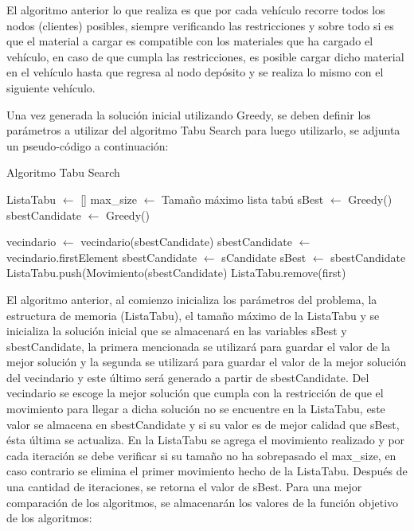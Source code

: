 \documentclass[conference]{IEEEtran}
\begin{document}
El algoritmo anterior lo que realiza es que por cada veh\'iculo recorre todos los nodos (clientes) posibles, siempre verificando las restricciones y sobre todo si es que el material a cargar es compatible con los materiales que ha cargado el veh\'iculo, en caso de que cumpla las restricciones, es posible cargar dicho material en el veh\'iculo hasta que regresa al nodo dep\'osito y se realiza lo mismo con el siguiente veh\'iculo.

Una vez generada la soluci\'on inicial utilizando Greedy, se deben definir los par\'ametros a utilizar del algoritmo Tabu Search para luego utilizarlo, se adjunta un pseudo-c\'odigo a continuaci\'on:

\begin{algorithm}
\caption{Algoritmo Tabu Search}
\begin{algorithmic}[1]

\STATE ListaTabu $\gets$ []
\STATE max\_size $\gets$ Tama\~no m\'aximo lista tab\'u
\STATE sBest $\gets$ Greedy()
\STATE sbestCandidate $\gets$ Greedy()

    \STATE vecindario $\gets$ vecindario(sbestCandidate)
    \STATE sbestCandidate $\gets$ vecindario.firstElement
                \STATE sbestCandidate $\gets$ sCandidate
        \ENDIF
    \ENDFOR
        \STATE sBest $\gets$ sbestCandidate
    \ENDIF
    \STATE ListaTabu.push(Movimiento(sbestCandidate)
        \STATE ListaTabu.remove(first)
    \ENDIF
\ENDWHILE

\end{algorithmic}
\end{algorithm}

El algoritmo anterior, al comienzo inicializa los par\'ametros del problema, la estructura de memoria (ListaTabu), el tama\~no m\'aximo de la ListaTabu y se inicializa la soluci\'on inicial que se almacenar\'a en las variables sBest y sbestCandidate, la primera mencionada se utilizar\'a para guardar el valor de la mejor soluci\'on y la segunda se utilizar\'a para guardar el valor de la mejor soluci\'on del vecindario y este \'ultimo ser\'a generado a partir de sbestCandidate. Del vecindario se escoge la mejor soluci\'on que cumpla con la restricci\'on de que el movimiento para llegar a dicha soluci\'on no se encuentre en la ListaTabu, este valor se almacena en sbestCandidate y si su valor es de mejor calidad que sBest, \'esta \'ultima se actualiza. En la ListaTabu se agrega el movimiento realizado y por cada iteraci\'on se debe verificar si su tama\~no no ha sobrepasado el max\_size, en caso contrario se elimina el primer movimiento hecho de la ListaTabu. Despu\'es de una cantidad de iteraciones, se retorna el valor de sBest. Para una mejor comparaci\'on de los algoritmos, se almacenar\'an los valores de la funci\'on objetivo de los algoritmos:
\end{document}
